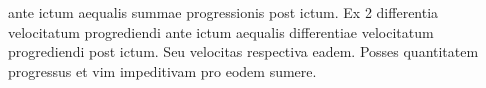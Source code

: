 ante ictum aequalis summae progressionis post ictum. 
Ex 2 differentia velocitatum progrediendi ante ictum
aequalis 
differentiae velocitatum progrediendi post ictum. 
Seu velocitas respectiva eadem. 
Posses quantitatem progressus et vim impeditivam
pro eodem sumere.
\pend 
